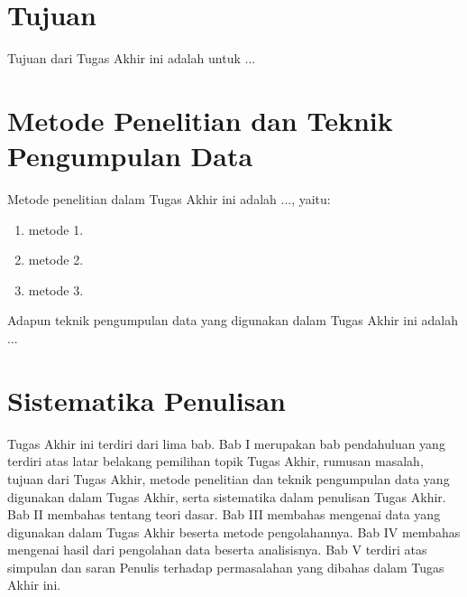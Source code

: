\section{Tujuan}

Tujuan dari Tugas Akhir ini adalah untuk ...

\section{Metode Penelitian dan Teknik Pengumpulan Data}

Metode penelitian dalam Tugas Akhir ini adalah ..., yaitu:
\begin{enumerate}
	\item metode 1.
	\item metode 2. 
	\item metode 3.
\end{enumerate}
	
	Adapun teknik pengumpulan data yang digunakan dalam Tugas Akhir ini adalah ... \\

\section{Sistematika Penulisan}

	Tugas Akhir ini terdiri dari lima bab. Bab I merupakan bab pendahuluan yang terdiri atas latar belakang pemilihan topik Tugas Akhir, rumusan masalah, tujuan dari Tugas Akhir, metode penelitian dan teknik pengumpulan data yang digunakan dalam Tugas Akhir, serta sistematika dalam penulisan Tugas Akhir. Bab II membahas tentang teori dasar. Bab III membahas mengenai data yang digunakan dalam Tugas Akhir beserta metode pengolahannya. Bab IV membahas mengenai hasil dari pengolahan data beserta analisisnya. Bab V terdiri atas simpulan dan saran Penulis terhadap permasalahan yang dibahas dalam Tugas Akhir ini. \\
